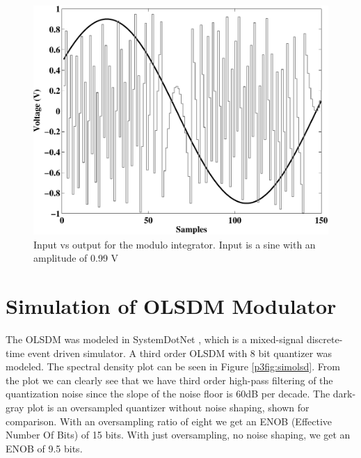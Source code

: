 \begin{figure}[ht]
\centering 
 \includegraphics[width=\myfigwidth]{graphics/modintsine}
  \caption{Input vs output for the modulo integrator. Input is a sine
  with an amplitude of 0.99 V}
  \label{p3fig:modintsine}
\end{figure}

\section{Simulation of OLSDM Modulator}\label{p3simulation}
The OLSDM was modeled in SystemDotNet \cite{systemdotnet05}, which is a
mixed-signal discrete-time event driven simulator. A third order
OLSDM with 8 bit quantizer was modeled. The spectral density plot can
be seen in Figure \ref{p3fig:simolsd}. From the plot we can clearly see
that we have third order high-pass filtering of the quantization
noise since the slope of the noise floor is 60dB per
decade. The dark-gray plot is an oversampled quantizer without noise
shaping, shown for comparison. With an
oversampling ratio of eight we get an ENOB (Effective Number
  Of Bits) of 15 bits. With just oversampling, no noise shaping, we
get an ENOB of 9.5 bits. 

